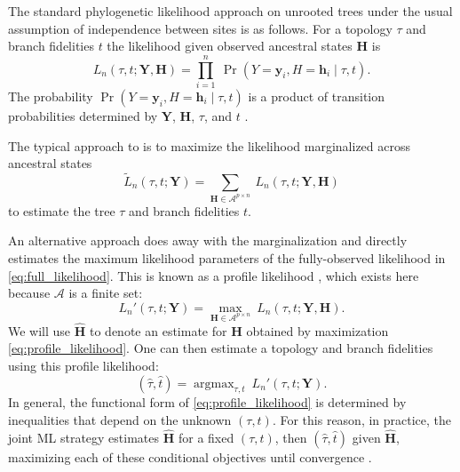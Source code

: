 \documentclass{article}
\newcommand{\alphabet}{\mathcal{A}}
\newcommand{\fullAlignment}{\mathbf{Y}}
\newcommand{\alignmentColumn}{\mathbf{y}}
\newcommand{\alignmentColumnRV}{Y}
\newcommand{\fullAncestralStates}{\mathbf{H}}
\newcommand{\ancestralStateColumn}{\mathbf{h}}
\newcommand{\ancestralStateColumnRV}{H}
\newcommand{\nCols}{n}
\newcommand{\nAncestralStateRows}{p}
\DeclareMathOperator*{\argmax}{argmax}
\begin{document}
The standard phylogenetic likelihood approach on unrooted trees under the usual assumption of independence between sites is as follows.
For a topology $\tau$ and branch fidelities $t$ the likelihood given observed ancestral states $\fullAncestralStates$ is
\begin{equation}
\label{eq:full_likelihood}
L_\nCols(\tau, t; \fullAlignment,\fullAncestralStates) = \prod_{i=1}^{\nCols} \ \Pr(\alignmentColumnRV=\alignmentColumn_i, \ancestralStateColumnRV=\ancestralStateColumn_i \mid \tau, t).
\end{equation}
The probability $\Pr(\alignmentColumnRV=\alignmentColumn_i, \ancestralStateColumnRV=\ancestralStateColumn_i \mid \tau, t)$ is a product of transition probabilities determined by $\fullAlignment$, $\fullAncestralStates$, $\tau$, and $t$ \cite{Felsenstein2004}.

The typical approach to is to maximize the likelihood marginalized across ancestral states
\begin{equation}
\label{eq:marginal_likelihood}
\tilde{L}_\nCols(\tau, t; \fullAlignment) = \sum_{\fullAncestralStates\in\alphabet^{\nAncestralStateRows\times\nCols}} \ L_\nCols(\tau, t; \fullAlignment, \fullAncestralStates)
\end{equation}
to estimate the tree $\tau$ and branch fidelities $t$.

An alternative approach \cite{Sagulenko2017-jo} does away with the marginalization and directly estimates the maximum likelihood parameters of the fully-observed likelihood in \eqref{eq:full_likelihood}.
This is known as a profile likelihood \cite{Murphy2000-ry}, which exists here because $\alphabet$ is a finite set:
\begin{equation}
\label{eq:profile_likelihood}
L_\nCols'(\tau, t; \fullAlignment) = \max_{\fullAncestralStates\in\alphabet^{\nAncestralStateRows\times\nCols}} \ L_\nCols(\tau, t; \fullAlignment, \fullAncestralStates).
\end{equation}
We will use $\hat{\fullAncestralStates}$ to denote an estimate for $\fullAncestralStates$ obtained by maximization \eqref{eq:profile_likelihood}.
One can then estimate a topology and branch fidelities using this profile likelihood:
\begin{equation}
\label{eq:profile_likelihood_topology_bl}
(\hat{\tau}, \hat{t}) = \argmax_{\tau, t} \ L_\nCols'(\tau, t; \fullAlignment).
\end{equation}
In general, the functional form of \eqref{eq:profile_likelihood} is determined by inequalities that depend on the unknown $(\tau,t)$.
For this reason, in practice, the joint ML strategy estimates $\hat{\fullAncestralStates}$ for a fixed $(\tau,t)$, then $(\hat{\tau},\hat{t})$ given $\hat{\fullAncestralStates}$, maximizing each of these conditional objectives until convergence \cite{Sagulenko2017-jo}.
\end{document}
